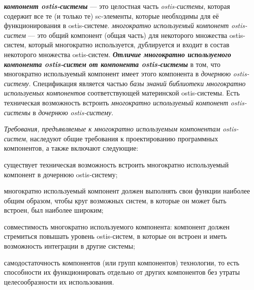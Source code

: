 \begin{SCn}
\end{SCn}

\textbf{\textit{компонент ostis-системы}} --- это целостная часть \textit{ostis-системы}, которая содержит все те (и только те) sc-элементы, которые необходимы для её функционирования в ostis-системе. \textit{многократно используемый компонент ostis-систем} --- это общий компонент (общая часть) для некоторого множества ostis-систем, который многократно используется, дублируется и входит в состав некоторого множества ostis-систем.
\textbf{\textit{Отличие многократно используемого компонента ostis-систем от компонента ostis-системы}} в том, что многократно используемый компонент имеет  этого компонента в \textit{дочернюю ostis-систему}. Спецификация является частью \textit{базы знаний библиотеки многократно используемых компонентов} соответствующей материнской ostis-системы. Есть техническая возможность встроить \textit{многократно используемый компонент ostis-системы} в \textit{дочернюю ostis-систему}.

\textit{Требования, предъявляемые к многократно используемым компонентам ostis-систем}, наследуют общие требования к проектированию программных компонентов, а также включают следующие:
\begin{textitemize}
	\item существует техническая возможность встроить многократно используемый компонент в дочернюю ostis-систему;
	\item многократно используемый компонент должен выполнять свои функции наиболее общим образом, чтобы круг возможных систем, в которые он может быть встроен, был наиболее широким;
	\item совместимость многократно используемого компонента: компонент должен стремиться повышать уровень  ostis-систем, в которые он встроен и иметь возможность  интеграции в другие системы;
	\item самодостаточность компонентов (или групп компонентов) технологии, то есть способности их функционировать отдельно от других компонентов без утраты целесообразности их использования.
\end{textitemize}

